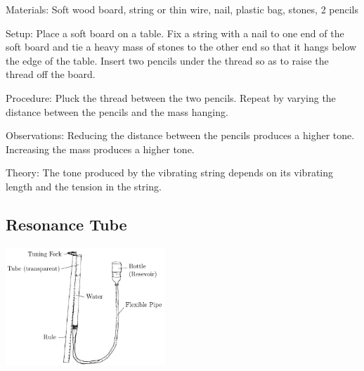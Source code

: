 \begin{multicols}{2}
\begin{description*}
\item[Materials:]{Soft wood board, string or thin wire, nail, plastic bag, stones, 2 pencils}
\item[Setup:]{Place a soft board on a table. Fix a string with a nail to one end of the soft board and tie a heavy mass of stones to the other end so that it hangs below the edge of the table. Insert two pencils under the thread so as to raise the thread off the board.}
\item[Procedure:]{Pluck the thread between the two pencils. Repeat by varying the distance between the pencils and the mass hanging.}
\item[Observations:]{Reducing the distance between the pencils produces a higher tone. Increasing the mass produces a higher tone.}
\item[Theory:]{The tone produced by the vibrating string depends on its vibrating length and the tension in the string.}
\end{description*}

\subsection{Resonance Tube}

\begin{center}
\includegraphics[width=0.45\textwidth]{./img/resonance-tube.png}
\end{center}


\end{multicols}
